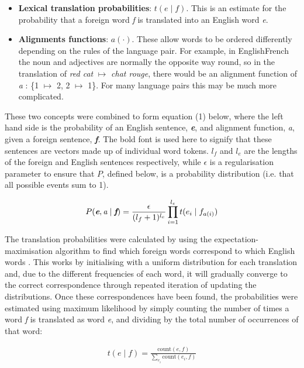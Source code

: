 \documentclass[11pt]{article}
\begin{document}
\begin{itemize}
\item \textbf{Lexical translation probabilities}: $t(e \mid f)$. This is an estimate for the probability that a foreign word \textit{f} is translated into an English word \textit{e}.
\item \textbf{Alignments functions}: $a(\cdot)$. These allow words to be ordered differently depending on the rules of the language pair. For example, in English\textendash French the noun and adjectives are normally the opposite way round, so in the translation of \textit{red cat} $\mapsto$ \textit{chat rouge}, there would be an alignment function of \textit{a} : \{1 $\mapsto$ 2, 2 $\mapsto$ 1\}. For many language pairs this may be much more complicated.
\end{itemize}

These two concepts were combined to form equation (1) below, where the left hand side is the probability of an English sentence, \textit{\textbf{e}}, and alignment function, \textit{a}, given a foreign sentence, \textit{\textbf{f}}. The bold font is used here to signify that these sentences are vectors made up of individual word tokens. $l_f$ and $l_e$ are the lengths of the foreign and English sentences respectively, while $\epsilon$ is a regularisation parameter to ensure that $P$, defined below, is a probability distribution (i.e. that all possible events sum to 1).

\begin{align}
    P(\textit{\textbf{e}}, \textit{a} \mid \textit{\textbf{f}}) = \frac{\epsilon}{(l_f+1)^{l_e}} \prod_{i = 1}^{l_e} t(e_i \mid f_{a(i)})
\end{align}

The translation probabilities were calculated by using the expectation-maximisation algorithm to find which foreign words correspond to which English words \citep[p. 89]{koehn2010}. This works by initialising with a uniform distribution for each translation and, due to the different frequencies of each word, it will gradually converge to the correct correspondence through repeated iteration of updating the distributions. Once these correspondences have been found, the probabilities were estimated using maximum likelihood by simply counting the number of times a word \textit{f} is translated as word \textit{e}, and dividing by the total number of occurrences of that word:

\begin{align}
t(e \mid f) = \frac{\textrm{count}(e, f)}{\sum_{e_i} \textrm{count}(e_i, f)}
\end{align}
\end{document}
